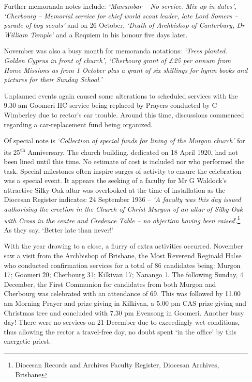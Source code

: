 Further memoranda notes include: \emph{`Manumbar -- No service. Mix up in dates'}, \emph{`Cherbourg -- Memorial service for chief world scout leader, late Lord Somers -- parade of boy scouts'} and on 26 October, \emph{`Death of Archbishop of Canterbury, Dr William Temple'} and a Requiem in his honour five days later.



November was also a busy month for memoranda notations: \emph{`Trees planted. Golden Cyprus in front of church'}, \emph{`Cherbourg grant of \pounds25 per annum from Home Missions as from 1 October plus a grant of six shillings for hymn books and pictures for their Sunday School.'}



Unplanned events again caused some alterations to scheduled services with the 9.30 am Goomeri HC service being replaced by Prayers conducted by C Wimberley due to rector's car trouble. Around this time, discussions commenced regarding a car-replacement fund being organized.



Of special note is \emph{`Collection of special funds for lining of the Murgon church'} for its 25\textsuperscript{th} Anniversary. The church building, dedicated on 18 April 1920, had not been lined until this time. No estimate of cost is included nor who performed the task. Special milestones often inspire surges of activity to ensure the celebration was a special event. It appears the seeking of a faculty for Mr G Waldock's attractive Silky Oak altar was overlooked at the time of installation as the Diocesan Register indicates: 24 September 1936 -- \emph{`A faculty was this day issued authorising the erection in the Church of Christ Murgon of an altar of Silky Oak with Cross in the centre and Credence Table -- no objection having been raised}'.\footnote{Diocesan Records and Archives Faculty Register, Diocesan Archives, Brisbane} As they say, `Better late than never!'


With the year drawing to a close, a flurry of extra activities occurred. November saw a visit from the Archbishop of Brisbane, the Most Reverend Reginald Halse who conducted confirmation services for a total of 86 candidates being: Murgon 17; Goomeri 20; Cherbourg 31; Kilkivan 17; Nanango 1. The following Sunday, 4 December, the First Communion for candidates from both Murgon and Cherbourg was celebrated with an attendance of 69. This was followed by 11.00 am Morning Prayer and prize giving in Kilkivan, a 5.00 pm CAS prize giving and Christmas tree and concluded with 7.30 pm Evensong in Goomeri. Another busy day! There were no services on 21 December due to exceedingly wet conditions, thus allowing the rector a travel-free day, no doubt spent `in the office' by this energetic priest.



